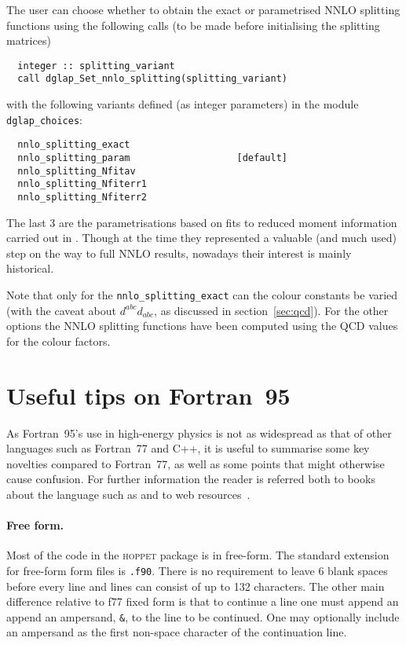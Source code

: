 \documentclass[12pt]{article}
\newcommand{\hoppet}{\textsc{hoppet}\xspace}
\newcommand{\ttt}[1]{\texttt{#1}}
\begin{document}
The user can choose whether to obtain the exact or parametrised NNLO
splitting functions using the following calls (to be made before
initialising the splitting matrices)
\begin{lstlisting}
  integer :: splitting_variant
  call dglap_Set_nnlo_splitting(splitting_variant)
\end{lstlisting}
with the following variants defined (as integer parameters) in the
module \ttt{dglap\_choices}:
\begin{lstlisting}
  nnlo_splitting_exact
  nnlo_splitting_param                   [default]
  nnlo_splitting_Nfitav
  nnlo_splitting_Nfiterr1
  nnlo_splitting_Nfiterr2
\end{lstlisting}
The last 3 are the parametrisations based on fits to reduced moment
information carried out in \cite{vanNeerven:1999ca,vanNeerven:2000uj}.
Though at the time they represented a valuable (and much used) step on
the way to full NNLO results, nowadays their interest is mainly
historical.

Note that only for the \ttt{nnlo\_splitting\_exact} can the colour
constants be varied (with the caveat about $d^{abc}d_{abc}$, as
discussed in section~\ref{sec:qcd}). For the other options the
NNLO splitting functions have been computed using the QCD values
for the colour factors.

\section{Useful tips on Fortran~95}
\label{sec:f95appendix}

As Fortran~95's use in high-energy physics is not as widespread as
that of other languages such as Fortran~77 and C++, it is useful to
summarise some key novelties compared to Fortran~77, as well as some
points that might otherwise cause confusion. For further information
the reader is referred both to books about the language such as
\cite{F95Explained} and to web resources~\cite{F95WebResources}.

\paragraph{Free form.}  Most of the code in the \hoppet package is in
free-form. The standard extension for free-form form files is
\ttt{.f90}. There is no requirement to leave 6 blank spaces before
every line and lines can consist of up to 132 characters. The other
main difference relative to f77 fixed form is that to continue a line
one must append an append an ampersand, \ttt{\&}, to the line to be
continued. One may optionally include an ampersand as the first
non-space character of the continuation line.
\end{document}
